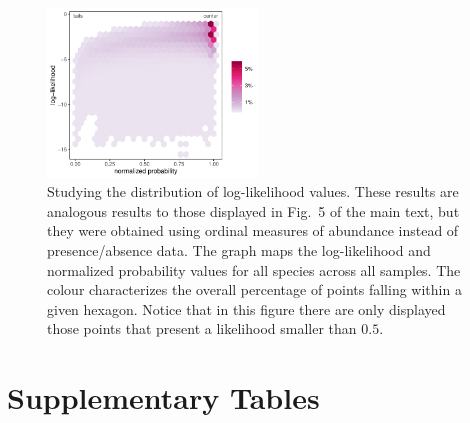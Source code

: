 \documentclass[11pt, a4paper]{article}
\begin{document}
\clearpage

\begin{figure}[ht]
  \centering
    \includegraphics[width=0.5\textwidth]{figures/loglik-notshow}
    	  \vspace{0.1cm}
	   \caption{Studying the distribution of log-likelihood values. These results are analogous results to those displayed in Fig.~5 of the main text, but they were obtained using ordinal measures of abundance instead of presence/absence data. The graph maps the log-likelihood and normalized probability values for all species across all samples. The colour characterizes the overall percentage of points falling within a given hexagon. Notice that in this figure there are only displayed those points that present a likelihood smaller than $0.5$.}
      \label{sfig:loglik-all-categorical}
\end{figure}

\clearpage

\section*{Supplementary Tables}
\end{document}
